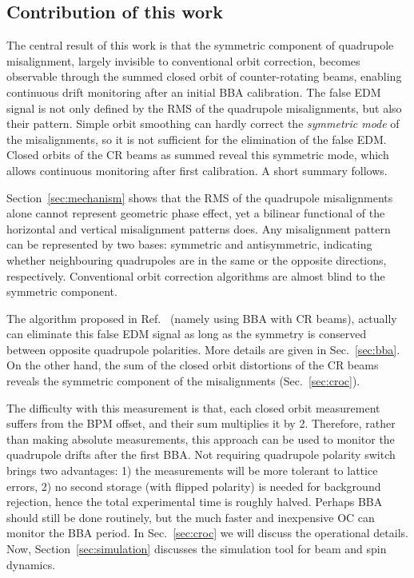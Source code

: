 \documentclass[aps,prab,reprint,superscriptaddress,nofootinbib]{revtex4-2}
\begin{document}
	\subsection{Contribution of this work}
	\label{sec:contribution}
	The central result of this work is that the symmetric component of quadrupole misalignment, largely invisible to conventional orbit correction, becomes observable through the summed closed orbit of counter-rotating beams, enabling continuous drift monitoring after an initial BBA calibration. The false EDM signal is not only defined by the RMS of the quadrupole misalignments, but also their pattern. Simple orbit smoothing can hardly correct the \textit{symmetric mode} of the misalignments, so it is not sufficient for the elimination of the false EDM. Closed orbits of the CR beams as summed reveal this symmetric mode, which allows continuous monitoring after first calibration. A short summary follows.

	Section~\ref{sec:mechanism} shows that the RMS of the quadrupole misalignments alone cannot represent geometric phase effect, yet a bilinear functional of the horizontal and vertical misalignment patterns does. Any misalignment pattern can be represented by two bases: symmetric and antisymmetric, indicating whether neighbouring quadrupoles are in the same or the opposite directions, respectively. Conventional orbit correction algorithms are almost blind to the symmetric component.

	The algorithm proposed in Ref.~\cite{omarov} (namely using BBA with CR beams), actually can eliminate this false EDM signal as long as the symmetry is conserved between opposite quadrupole polarities. More details are given in Sec.~\ref{sec:bba}. On the other hand, the sum of the closed orbit distortions of the CR beams reveals the symmetric component of the misalignments (Sec.~\ref{sec:croc}).

	The difficulty with this measurement is that, each closed orbit measurement suffers from the BPM offset, and their sum multiplies it by 2. Therefore, rather than making absolute measurements, this approach can be used to monitor the quadrupole drifts after the first BBA. Not requiring quadrupole polarity switch brings two advantages: 1) the measurements will be more tolerant to lattice errors, 2) no second storage (with flipped polarity) is needed for background rejection, hence the total experimental time is roughly halved. Perhaps BBA should still be done routinely, but the much faster and inexpensive OC can monitor the BBA period. In Sec.~\ref{sec:croc} we will discuss the operational details. Now, Section~\ref{sec:simulation} discusses the simulation tool for beam and spin dynamics.
\end{document}
